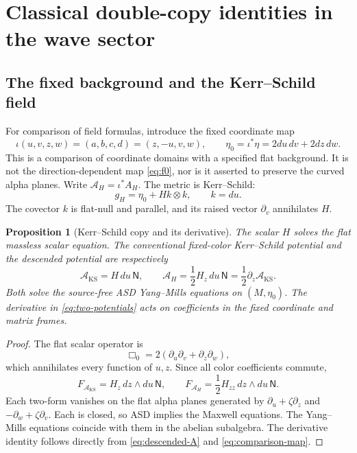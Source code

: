 \documentclass[11pt]{article}
\numberwithin{equation}{section}
\newtheorem{proposition}[theorem]{Proposition}
\theoremstyle{definition}
\theoremstyle{remark}
\newcommand{\NN}{\mathsf N}
\newcommand{\KS}{\mathrm{KS}}
\begin{document}
\section{Classical double-copy identities in the wave sector}\label{sec:copies}

\subsection{The fixed background and the Kerr--Schild field}

For comparison of field formulas, introduce the fixed coordinate map
\begin{equation}\label{eq:comparison-map}
\iota(u,v,z,w)=(a,b,c,d)=(z,-u,v,w),
\qquad \eta_0=\iota^*\eta=2du\,dv+2dz\,dw.
\end{equation}
This is a comparison of coordinate domains with a specified flat background. It is not the direction-dependent map \eqref{eq:f0}, nor is it asserted to preserve the curved alpha planes. Write $\mathcal A_H=\iota^*A_H$. The metric is Kerr--Schild:
\begin{equation}\label{eq:KS-metric}
g_H=\eta_0+Hk\otimes k,\qquad k=du.
\end{equation}
The covector $k$ is flat-null and parallel, and its raised vector $\partial_v$ annihilates $H$.

\begin{proposition}[Kerr--Schild copy and its derivative]\label{prop:KS}
The scalar $H$ solves the flat massless scalar equation. The conventional fixed-color Kerr--Schild potential and the descended potential are respectively
\begin{equation}\label{eq:two-potentials}
\mathcal A_{\KS}=H\,du\,\NN,
\qquad
\mathcal A_H=\frac12H_z\,du\,\NN
=\frac12\partial_z\mathcal A_{\KS}.
\end{equation}
Both solve the source-free ASD Yang--Mills equations on $(M,\eta_0)$. The derivative in \eqref{eq:two-potentials} acts on coefficients in the fixed coordinate and matrix frames.
\end{proposition}
\begin{proof}
The flat scalar operator is
\begin{equation}\label{eq:flatbox}
\Box_0=2(\partial_u\partial_v+\partial_z\partial_w),
\end{equation}
which annihilates every function of $u,z$. Since all color coefficients commute,
\begin{equation}\label{eq:two-curvatures}
F_{\mathcal A_{\KS}}=H_z\,dz\wedge du\,\NN,
\qquad
F_{\mathcal A_H}=\frac12H_{zz}\,dz\wedge du\,\NN.
\end{equation}
Each two-form vanishes on the flat alpha planes generated by $\partial_u+\zeta\partial_z$ and $-\partial_w+\zeta\partial_v$. Each is closed, so ASD implies the Maxwell equations. The Yang--Mills equations coincide with them in the abelian subalgebra. The derivative identity follows directly from \eqref{eq:descended-A} and \eqref{eq:comparison-map}.
\end{proof}
\end{document}
